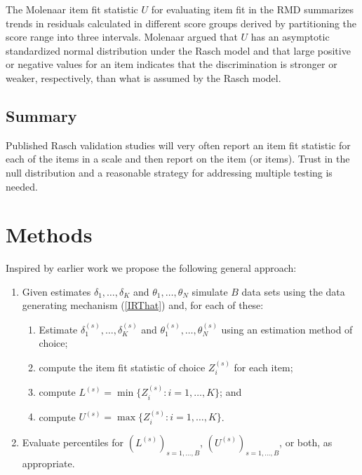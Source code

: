 \documentclass[11pt,a4paper]{article}
\begin{document}
The Molenaar \citeyear{Molenaar-1983} item fit statistic $U$ for evaluating item fit in the RMD summarizes trends in residuals calculated in different score groups derived by partitioning the score range into three intervals. Molenaar argued that $U$ has an asymptotic standardized normal distribution under the Rasch model and that large positive or negative values for an item indicates that the discrimination is stronger or weaker, respectively, than what is assumed by the Rasch model. 

\subsection{Summary}

Published Rasch validation studies will very often report an item fit statistic for each of the items in a scale and then report on the item (or items). Trust in the null distribution and a reasonable strategy for addressing multiple testing is needed. 

\section{Methods}

Inspired by earlier work \cite{Stone-2000,Su-Sheu-Wang-2007,Wolfe-2008,Hodge-Morgan-2017} we propose the following general approach:

\begin{enumerate}
\item Given estimates $\delta_1,\ldots,\delta_K$ and $\theta_1,\ldots,\theta_N$ simulate $B$ data sets using the data generating mechanism (\ref{IRThat}) and, for each of these:
\begin{enumerate}
\item Estimate $\delta_1^{(s)},\ldots,\delta_K^{(s)}$ and $\theta_1^{(s)},\ldots,\theta_N^{(s)}$ using an estimation method of choice;
\item compute the item fit statistic of choice $Z_i^{(s)}$ for each item;
\item compute $L^{(s)}=\min\{Z_i^{(s)}:i=1,\ldots,K\}$; and
\item compute $U^{(s)}=\max\{Z_i^{(s)}:i=1,\ldots,K\}$.
\end{enumerate}
\item Evaluate percentiles for $(L^{(s)})_{s=1,\ldots,B}$, $(U^{(s)})_{s=1,\ldots,B}$, or both, as appropriate.
\end{enumerate}
\end{document}
